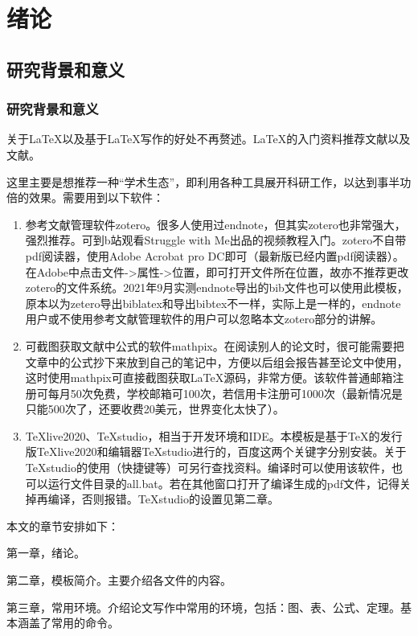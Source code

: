 \chapter{绪论}
%
\section{研究背景和意义}
\subsection{研究背景和意义}
%
关于\LaTeX{}以及基于\LaTeX{}写作的好处不再赘述。\LaTeX{}的入门资料推荐文献\parencite{_g}以及文献\parencite{_c}。

这里主要是想推荐一种“学术生态”，即利用各种工具展开科研工作，以达到事半功倍的效果。需要用到以下软件：
\begin{enumerate}[topsep = 0 pt, itemsep= 0 pt, parsep=0pt, partopsep=0pt, leftmargin=44pt, itemindent=0pt, labelsep=6pt, label=(\arabic*)]
	\item 	参考文献管理软件zotero\cite{_m}。很多人使用过endnote，但其实zotero也非常强大，强烈推荐。可到b站观看Struggle with Me出品的视频教程\cite{_k}入门。zotero不自带pdf阅读器，使用Adobe Acrobat pro DC即可（最新版已经内置pdf阅读器）。在Adobe中点击文件->属性->位置，即可打开文件所在位置，故亦不推荐更改zotero的文件系统。2021年9月实测endnote导出的bib文件也可以使用此模板，原本以为zetero导出biblatex和导出bibtex不一样，实际上是一样的，endnote用户或不使用参考文献管理软件的用户可以忽略本文zotero部分的讲解。
	\item	可截图获取文献中公式的软件mathpix\cite{_h}。在阅读别人的论文时，很可能需要把文章中的公式抄下来放到自己的笔记中，方便以后组会报告甚至论文中使用，这时使用mathpix可直接截图获取\LaTeX{}源码，非常方便。该软件普通邮箱注册可每月50次免费，学校邮箱可100次，若信用卡注册可1000次（最新情况是只能500次了，还要收费20美元，世界变化太快了）。	
	\item	TeXlive2020、TeXstudio，相当于开发环境和IDE。本模板是基于TeX的发行版TeXlive2020和编辑器TeXstudio进行的，百度这两个关键字分别安装。关于TeXstudio的使用（快捷键等）可另行查找资料。编译时可以使用该软件，也可以运行文件目录的all.bat。若在其他窗口打开了编译生成的pdf文件，记得关掉再编译，否则报错。TeXstudio的设置见第二章。
\end{enumerate}

本文的章节安排如下：

第一章，绪论。

第二章，模板简介。主要介绍各文件的内容。

第三章，常用环境。介绍论文写作中常用的环境，包括：图、表、公式、定理。基本涵盖了常用的命令。



